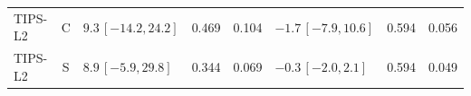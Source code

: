 \begin{longtable}{lcp{37mm}rrp{37mm}rr}
TIPS-L2 & C & \(9.3\,[-14.2,24.2]\) & 0.469 & 0.104 & \(-1.7\,[-7.9,10.6]\) & 0.594 & 0.056\\
TIPS-L2 & S & \(8.9\,[-5.9,29.8]\) & 0.344 & 0.069 & \(-0.3\,[-2.0,2.1]\) & 0.594 & 0.049\\

\end{longtable}
